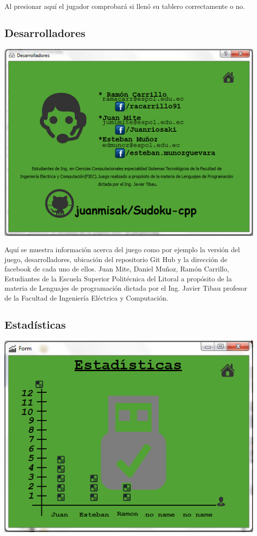 \documentclass[a4paper,11pt]{article}
\begin{document}
Al presionar aquí el jugador comprobará si llenó su tablero correctamente o no.
\subsection{Desarrolladores}
\includegraphics{pagdesa.png}

Aquí se muestra información acerca del juego como por ejemplo la versión del juego, desarrolladores, ubicación del repositorio Git Hub y la dirección de facebook de cada uno de ellos.
Juan Mite, Daniel Muñoz, Ramón Carrillo, Estudiantes de la Escuela Superior Politécnica del Litoral a propósito de la materia de Lenguajes de programación dictada por el Ing. Javier Tibau profesor de la Facultad de Ingeniería Eléctrica y Computación.  
\subsection{Estadísticas}
\includegraphics{estadist.png}
\end{document}
